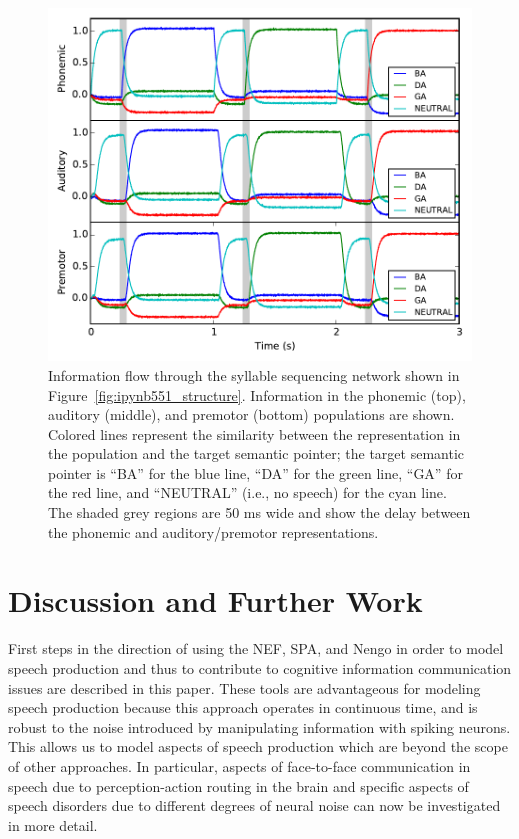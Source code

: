 \documentclass[conference]{IEEEtran}
\begin{document}
\begin{figure}
\centering
\includegraphics[width=\columnwidth]{ipynb551_output}
\caption{Information flow through the syllable sequencing
  network shown in Figure~\ref{fig:ipynb551_structure}.
  Information in the phonemic (top), auditory (middle),
  and premotor (bottom) populations are shown.
  Colored lines represent the similarity between the
  representation in the population and the target semantic pointer;
  the target semantic pointer is ``BA'' for the blue line,
  ``DA'' for the green line, ``GA'' for the red line,
  and ``NEUTRAL'' (i.e., no speech) for the cyan line.
  The shaded grey regions are 50 ms wide and show the delay
  between the phonemic and auditory/premotor representations.}
\label{fig:ipynb551_output}
\end{figure}

\section{Discussion and Further Work}

First steps in the direction of using the NEF, SPA, and Nengo
in order to model speech production and thus to contribute
to cognitive information communication issues
\cite{Baranyi2012} are
described in this paper. These tools are advantageous
for modeling speech production because this
approach operates in continuous time, and is robust to the
noise introduced by manipulating information with spiking neurons.
This allows us to model aspects of speech production
which are beyond the scope of other approaches. In particular,
aspects of face-to-face communication in speech due to
perception-action routing in the brain and specific aspects of speech
disorders due to different degrees of neural noise
can now be investigated in more detail.
\end{document}
